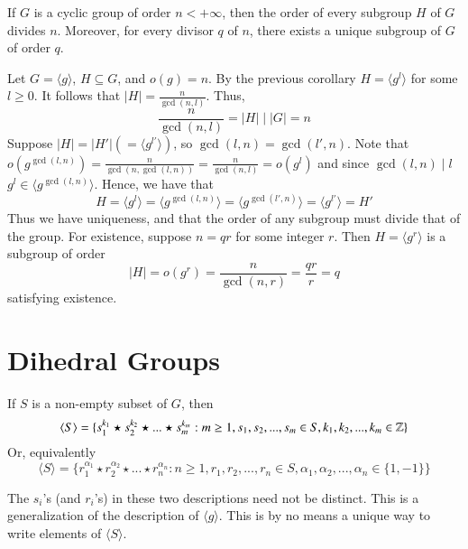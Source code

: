 \documentclass[12pt, a4paper, twoside, openright, titlepage]{book}
\begin{document}
\begin{thm}{}{}
        If $G$ is a cyclic group of order $n < +\infty$, then the order of every subgroup $H$ of $G$ divides $n$. Moreover, for every divisor $q$ of $n$, there exists a unique subgroup of $G$ of order $q$.
\end{thm}
\begin{proof*}{}{}
        Let $G = \langle g \rangle$, $H \subseteq G$, and $o(g) = n$. By the previous corollary $H = \langle g^l \rangle$ for some $l \geq 0$. It follows that $|H| = \frac{n}{\gcd(n,l)}$. Thus, $$\frac{n}{\gcd(n,l)} = |H|\;\vert\;|G| = n$$ Suppose $|H| = |H'| (=\langle g^{l'}\rangle)$, so $\gcd(l,n) = \gcd(l',n)$. Note that $o(g^{\gcd(l,n)}) = \frac{n}{\gcd(n,\gcd(l,n))} = \frac{n}{\gcd(n,l)} = o(g^l)$ and since $\gcd(l,n)\;\vert\;l$ $g^l \in \langle g^{\gcd(l,n)}\rangle$. Hence, we have that \begin{equation}
                H = \langle g^l \rangle = \langle g^{\gcd(l,n)} \rangle = \langle g^{\gcd(l',n)} \rangle = \langle g^{l'} \rangle = H'
        \end{equation}
        Thus we have uniqueness, and that the order of any subgroup must divide that of the group. For existence, suppose $n = qr$ for some integer $r$. Then $H = \langle g^r\rangle$ is a subgroup of order $$|H| = o(g^r) = \frac{n}{\gcd(n,r)} = \frac{qr}{r} = q$$ satisfying existence.
\end{proof*}



\section{\textsection Dihedral Groups}

\begin{claim}{}{}
    If $S$ is a non-empty subset of $G$, then \begin{equation}
        \langle S\rangle = \{s_1^{k_1}\star s_2^{k_2} \star ... \star s_m^{k_m}: m\geq 1, s_1,s_2,...,s_m \in S,k_1,k_2,...,k_m\in\mathbb Z\}
    \end{equation}
    Or, equivalently \begin{equation}
        \langle S\rangle = \{r_1^{\alpha_1}\star r_2^{\alpha_2} \star ... \star r_n^{\alpha_n}: n\geq 1, r_1,r_2,...,r_n \in S,\alpha_1,\alpha_2,...,\alpha_n\in\{1,-1\}\}
    \end{equation}
\end{claim}

\begin{rmk}{}{}
    The $s_i$'s (and $r_i$'s) in these two descriptions need not be distinct. This is a generalization of the description of $\langle g \rangle$. This is by no means a unique way to write elements of $\langle S\rangle$.
\end{rmk}
\end{document}

